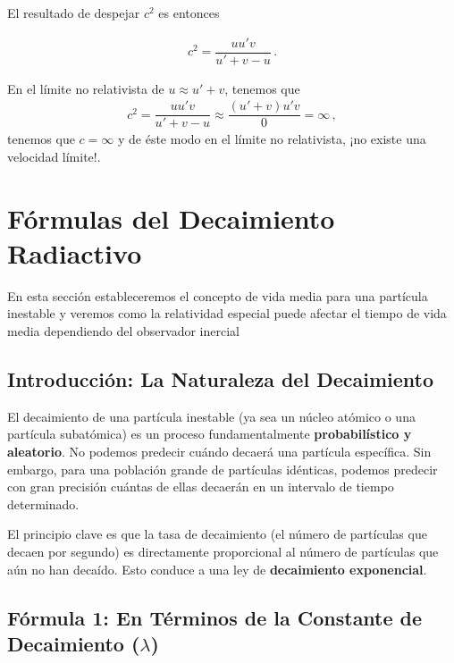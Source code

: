 \documentclass[11pt,a4paper]{article}
\begin{document}
El resultado de despejar $c^2$ es entonces

\begin{align}
\boxed{
    c^2 = \dfrac{u u'v}{ u' + v - u}
    \,.}
\end{align}

En el límite no relativista de $u\approx u'+v$, tenemos que
\begin{align}
    c^2 = \dfrac{u u'v}{ u' + v - u} \approx \dfrac{(u'+v) u'v}{0} = \infty\,, 
\end{align}
tenemos que  $c = \infty$ y de éste modo en el límite no relativista, ¡no existe una velocidad límite!.


\section{Fórmulas del Decaimiento Radiactivo}
En esta sección estableceremos el concepto de vida media para una partícula inestable y veremos como la relatividad especial puede afectar el tiempo de vida media dependiendo del observador inercial
\subsection*{Introducción: La Naturaleza del Decaimiento}

El decaimiento de una partícula inestable (ya sea un núcleo atómico o una partícula subatómica) es un proceso fundamentalmente \textbf{probabilístico y aleatorio}. No podemos predecir cuándo decaerá una partícula específica. Sin embargo, para una población grande de partículas idénticas, podemos predecir con gran precisión cuántas de ellas decaerán en un intervalo de tiempo determinado.

El principio clave es que la tasa de decaimiento (el número de partículas que decaen por segundo) es directamente proporcional al número de partículas que aún no han decaído. Esto conduce a una ley de \textbf{decaimiento exponencial}.

\subsection*{Fórmula 1: En Términos de la Constante de Decaimiento ($\lambda$)}
\end{document}
